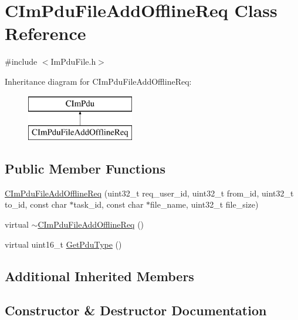 \hypertarget{class_c_im_pdu_file_add_offline_req}{}\section{C\+Im\+Pdu\+File\+Add\+Offline\+Req Class Reference}
\label{class_c_im_pdu_file_add_offline_req}


{\ttfamily \#include $<$Im\+Pdu\+File.\+h$>$}

Inheritance diagram for C\+Im\+Pdu\+File\+Add\+Offline\+Req\+:\begin{figure}[H]
\begin{center}
\leavevmode
\includegraphics[height=2.000000cm]{class_c_im_pdu_file_add_offline_req}
\end{center}
\end{figure}
\subsection*{Public Member Functions}
\begin{DoxyCompactItemize}
\item 
\hyperlink{class_c_im_pdu_file_add_offline_req_a2ae4a0b0b9b90a7e1d54fd64915fdfa5}{C\+Im\+Pdu\+File\+Add\+Offline\+Req} (uint32\+\_\+t req\+\_\+user\+\_\+id, uint32\+\_\+t from\+\_\+id, uint32\+\_\+t to\+\_\+id, const char $\ast$task\+\_\+id, const char $\ast$file\+\_\+name, uint32\+\_\+t file\+\_\+size)
\item 
virtual \hyperlink{class_c_im_pdu_file_add_offline_req_a0809f268e16146304f01a604a39e019e}{$\sim$\+C\+Im\+Pdu\+File\+Add\+Offline\+Req} ()
\item 
virtual uint16\+\_\+t \hyperlink{class_c_im_pdu_file_add_offline_req_af0877a3afb0ff13414bb354d3cd0fc0a}{Get\+Pdu\+Type} ()
\end{DoxyCompactItemize}
\subsection*{Additional Inherited Members}


\subsection{Constructor \& Destructor Documentation}
\hypertarget{class_c_im_pdu_file_add_offline_req_a2ae4a0b0b9b90a7e1d54fd64915fdfa5}{}
